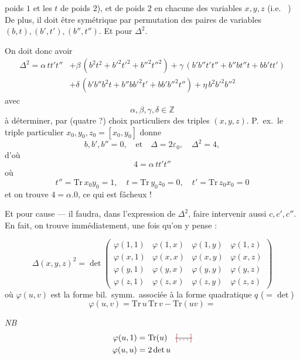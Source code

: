 \documentclass[11pt,a4paper]{article}
\begin{document}
poids $1$ et les $t$ de poids $2$), et de poids $2$ en chacune des
 variables $x, y, z$ (i.e.\ \ill{} )  De plus, il doit
être symétrique par permutation des \struck{\ill{}}  paires de variables
$(b,t), (b',t'), (b'',t'')$. Et  pour $\Delta^2$.

On doit donc avoir
\[
  \begin{aligned}
    \Delta^2 = \alpha\, tt't''
    &+ \beta\,(b^2t^2 + b'^2t'^2 + b''^2t''^2)
    + \gamma\,(b'b''t't'' + b''bt''t + bb'tt') \\
    &+ \delta\,(b'b''b^2 t + b''bb'^2 t' + bb'b''^2 t'')
    + \eta\, b^2 b'^2 b''^2
  \end{aligned}
\]
avec
\[
  \alpha, \beta, \gamma, \delta \in \mathbb{Z}
\]
à déterminer, par (quatre ?) choix particuliers  des triples $(x,y,z)$.
P.~ex.\ le triple particulier $x_0, y_0, z_0 = [x_0, y_0]$ donne
\[
  b, b', b'' = 0, \quad \text{et} \quad \Delta = 2\varepsilon_0, \quad \Delta^2 = 4 ,
\]
d'où
\[
  4 = \alpha\, tt't''
\]
où
\[
  t'' = \mathrm{Tr}\, x_0 y_0 = 1, \quad t = \mathrm{Tr}\, y_0 z_0 = 0, \quad t' = \mathrm{Tr}\, z_0 x_0 = 0
\]
et on trouve $4 = \alpha . 0$, ce qui est fâcheux !

Et pour cause --- il faudra, dans l'expression de $\Delta^2$, faire intervenir aussi
$c, c', c''$. En fait, on trouve immédiatement, une fois qu'on y pense :

\[
  \Delta(x,y,z)^2 = \det
  \begin{pmatrix}
    \varphi(1,1) & \varphi(1,x) & \varphi(1,y) & \varphi(1,z) \\
    \varphi(x,1) & \varphi(x,x) & \varphi(x,y) & \varphi(x,z) \\
    \varphi(y,1) & \varphi(y,x) & \varphi(y,y) & \varphi(y,z) \\
    \varphi(z,1) & \varphi(z,x) & \varphi(z,y) & \varphi(z,z)
  \end{pmatrix}
\]
où $\varphi(u,v)$ est la forme bil.\ symm.\ associée à la forme quadratique $q$
($= \det$)
\[
  \varphi(u,v) = \mathrm{Tr}\, u\, \mathrm{Tr}\, v - \mathrm{Tr}(uv) =
\]

\emph{NB} 
\[
  \begin{aligned}
    \varphi(u,1) &= \mathrm{Tr}(u) \quad \text{\struck{$\ill{}$}} \\
    \varphi(u,u) &= 2 \det u
  \end{aligned}
\]
\end{document}
